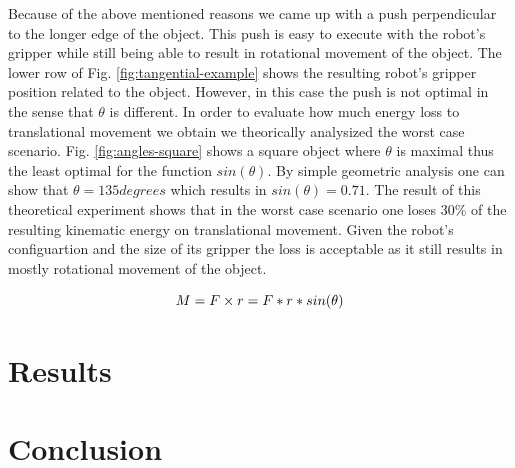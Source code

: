 Because of the above mentioned reasons we came up with a push perpendicular to the longer edge of the object. This push is easy to execute with the robot's gripper while still being able to result in rotational movement of the object. The lower row of Fig. \ref{fig:tangential-example} shows the resulting robot's gripper position related to the object. However, in this case the push is not optimal in the sense that $\theta$ is different. In order to evaluate how much energy loss to translational movement we obtain we theorically analysized the worst case scenario. Fig. \ref{fig:angles-square} shows a square object where $\theta$ is maximal thus the least optimal for the function $sin(\theta)$. By simple geometric analysis one can show that $\theta =135 degrees$ which results in $sin(\theta) = 0.71$. The result of this theoretical experiment shows that in the worst case scenario one loses 30\% of the resulting kinematic energy on translational movement. Given the robot's configuartion and the size of its gripper the loss is acceptable as it still results in mostly rotational movement of the object. 


\begin{equation}
M =  F \times r = F*r*sin(\theta)\\
\label{eq:max-torque}
\end{equation}




\section{Results}




\section{Conclusion}